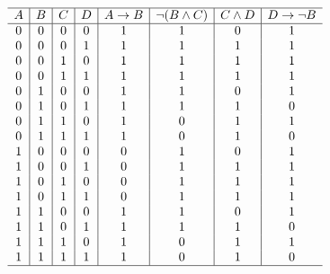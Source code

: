 {{\begin{practices}
            \begin{table}[H]
                \[
                    \begin{array}{c|c|c|c|c|c|c|c}
                        \hline
                        A & B & C & D & A \rightarrow B & \neg (B \wedge C) & C \wedge D & D \rightarrow \neg B \\
                        \hline
                        0 & 0 & 0 & 0 & 1 & 1 & 0 & 1 \\
                        0 & 0 & 0 & 1 & 1 & 1 & 1 & 1 \\
                        0 & 0 & 1 & 0 & 1 & 1 & 1 & 1 \\
                        0 & 0 & 1 & 1 & 1 & 1 & 1 & 1 \\
                        0 & 1 & 0 & 0 & 1 & 1 & 0 & 1 \\
                        0 & 1 & 0 & 1 & 1 & 1 & 1 & 0 \\
                        0 & 1 & 1 & 0 & 1 & 0 & 1 & 1 \\
                        0 & 1 & 1 & 1 & 1 & 0 & 1 & 0 \\
                        1 & 0 & 0 & 0 & 0 & 1 & 0 & 1 \\
                        1 & 0 & 0 & 1 & 0 & 1 & 1 & 1 \\
                        1 & 0 & 1 & 0 & 0 & 1 & 1 & 1 \\
                        1 & 0 & 1 & 1 & 0 & 1 & 1 & 1 \\
                        1 & 1 & 0 & 0 & 1 & 1 & 0 & 1 \\
                        1 & 1 & 0 & 1 & 1 & 1 & 1 & 0 \\
                        1 & 1 & 1 & 0 & 1 & 0 & 1 & 1 \\
                        1 & 1 & 1 & 1 & 1 & 0 & 1 & 0 \\
                        \hline
                   \end{array}
               \]
            \end{table}
        \end{practices}

}}
